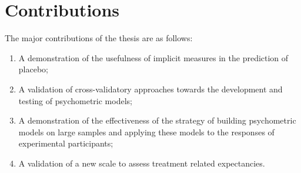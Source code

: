 \documentclass{article}
\begin{document}
\section{Contributions}
\label{sec:contributions}



The major contributions of the thesis are as follows:

\begin{enumerate}
\item A demonstration of the usefulness of implicit measures in the prediction of placebo;

\item A validation of cross-validatory approaches towards the development and testing of psychometric models;

\item A demonstration of the effectiveness of the strategy of building psychometric models on large samples and applying these models to the responses of experimental participants;

\item A validation of a new scale to assess treatment related expectancies.

\end{enumerate}



 
\end{document}
